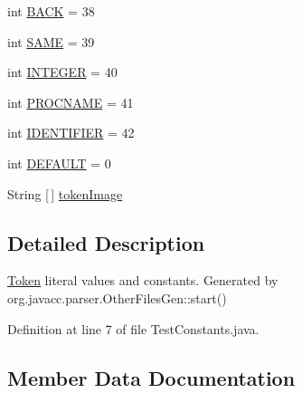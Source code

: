 \begin{DoxyCompactItemize}
\item 
int \mbox{\hyperlink{interfaceorg_1_1tec_1_1comp_1_1interpreter_1_1_test_constants_a7c76f8660a8f0b41389400b5fe94b532}{B\+A\+CK}} = 38
\item 
int \mbox{\hyperlink{interfaceorg_1_1tec_1_1comp_1_1interpreter_1_1_test_constants_aeb3b826d27bddf6045f93d2fe95f7951}{S\+A\+ME}} = 39
\item 
int \mbox{\hyperlink{interfaceorg_1_1tec_1_1comp_1_1interpreter_1_1_test_constants_a9bc1f2d43aed8342b70c6485d3d26c35}{I\+N\+T\+E\+G\+ER}} = 40
\item 
int \mbox{\hyperlink{interfaceorg_1_1tec_1_1comp_1_1interpreter_1_1_test_constants_acf012cee4f397b2de66c83aa9efcd5d7}{P\+R\+O\+C\+N\+A\+ME}} = 41
\item 
int \mbox{\hyperlink{interfaceorg_1_1tec_1_1comp_1_1interpreter_1_1_test_constants_ae2d1dbde341625b3caeed06453c56f9e}{I\+D\+E\+N\+T\+I\+F\+I\+ER}} = 42
\item 
int \mbox{\hyperlink{interfaceorg_1_1tec_1_1comp_1_1interpreter_1_1_test_constants_abbec7c654cf14c3a02e50918b6d82810}{D\+E\+F\+A\+U\+LT}} = 0
\item 
String \mbox{[}$\,$\mbox{]} \mbox{\hyperlink{interfaceorg_1_1tec_1_1comp_1_1interpreter_1_1_test_constants_afbcdceb8fb66947b9bba57b369318331}{token\+Image}}
\end{DoxyCompactItemize}


\subsection{Detailed Description}
\mbox{\hyperlink{classorg_1_1tec_1_1comp_1_1interpreter_1_1_token}{Token}} literal values and constants. Generated by org.\+javacc.\+parser.\+Other\+Files\+Gen\+::start() 

Definition at line 7 of file Test\+Constants.\+java.



\subsection{Member Data Documentation}
\mbox{\label{interfaceorg_1_1tec_1_1comp_1_1interpreter_1_1_test_constants_a7c76f8660a8f0b41389400b5fe94b532}} 
